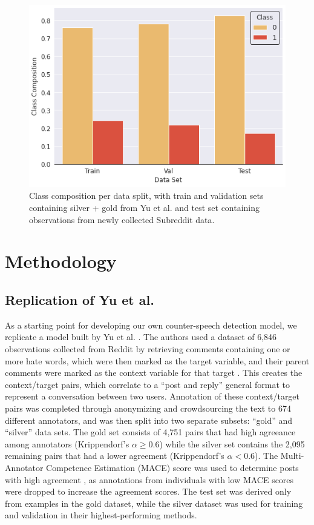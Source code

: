 \documentclass[10pt,twocolumn,letterpaper]{article}
\begin{document}
\begin{figure}[t]
    \centering
    \includegraphics[scale=0.5]{class_distribution.png}
    \caption{Class composition per data split, with train and validation sets containing silver + gold from Yu et al. and test set containing observations from newly collected Subreddit data.}
    \label{fig:class dist}
\end{figure}


\section{Methodology}

\subsection{Replication of Yu et al.}
As a starting point for developing our own counter-speech detection model, we replicate a model built by Yu et al. \cite{yu-etal-2022-hate}. The authors used a dataset of 6,846 observations collected from Reddit by retrieving comments containing one or more hate words, which were then marked as the target variable, and their parent comments were marked as the context variable for that target \cite{yu-etal-2022-hate}. This creates the context/target pairs, which correlate to a ``post and reply'' general format to represent a conversation between two users. Annotation of these context/target pairs was completed through anonymizing and crowdsourcing the text to 674 different annotators, and was then split into two separate subsets: ``gold'' and ``silver'' data sets. The gold set consists of 4,751 pairs that had high agreeance among annotators (Krippendorf's $\alpha \geq 0.6$) while the silver set contains the 2,095 remaining pairs that had a lower agreement (Krippendorf's $\alpha < 0.6$). The Multi-Annotator Competence Estimation (MACE) score \cite{hovy-etal-2013-learning} was used to determine posts with high agreement \cite{yu-etal-2022-hate}, as annotations from individuals with low MACE scores were dropped to increase the agreement scores. The test set was derived only from examples in the gold dataset, while the silver dataset was used for training and validation in their highest-performing methods.
\end{document}
